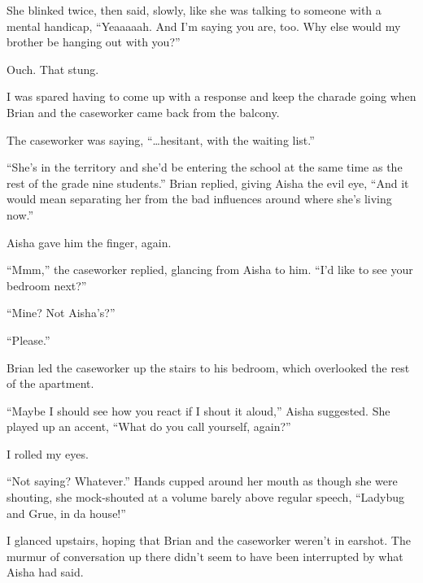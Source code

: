 She blinked twice, then said, slowly, like she was talking to someone with a mental handicap, ``Yeaaaaah.  And I'm saying you are, too.  Why else would my brother be hanging out with you?''



Ouch.  That stung.



I was spared having to come up with a response and keep the charade going when Brian and the caseworker came back from the balcony.



The caseworker was saying, ``\ldots{}hesitant, with the waiting list.''



``She's in the territory and she'd be entering the school at the same time as the rest of the grade nine students.'' Brian replied, giving Aisha the evil eye, ``And it would mean separating her from the bad influences around where she's living now.''



Aisha gave him the finger, again.



``Mmm,'' the caseworker replied, glancing from Aisha to him. ``I'd like to see your bedroom next?''



``Mine?  Not Aisha's?''



``Please.''



Brian led the caseworker up the stairs to his bedroom, which overlooked the rest of the apartment.



``Maybe I should see how you react if I shout it aloud,'' Aisha suggested.  She played up an accent, ``What do you call yourself, again?''



I rolled my eyes.



``Not saying?  Whatever.''  Hands cupped around her mouth as though she were shouting, she mock-shouted at a volume barely above regular speech, ``Ladybug and Grue, in da house!''



I glanced upstairs, hoping that Brian and the caseworker weren't in earshot.  The murmur of conversation up there didn't seem to have been interrupted by what Aisha had said.



